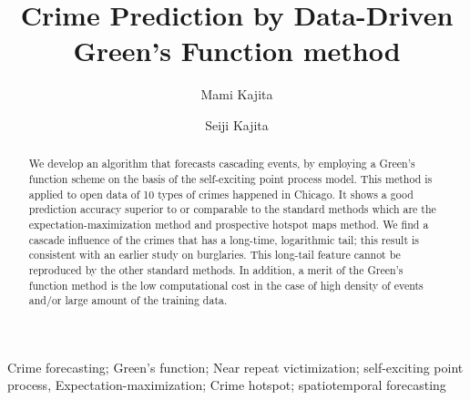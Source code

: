 \documentclass[review]{elsarticle}
\begin{document}
\begin{frontmatter}
\title{
Crime Prediction by Data-Driven Green's Function method
}
\author[mymainaddress,mysecondaryaddress]{Mami Kajita}
\author[mymainaddress]{Seiji Kajita}

\address[mymainaddress]{Singular Perturbations Inc, 1-5-6-5F, Kudanminami, Chiyoda-ku, Tokyo, 102-0074, Japan}
\address[mysecondaryaddress]{Center for Spatial Information Science (CSIS), the University of Tokyo, 5-1-5 Kashiwanoha, Kashiwa-shi, Chiba, 277-8568, Japan }

\begin{abstract}
We develop an algorithm that forecasts cascading events, by employing a Green's function scheme on the basis of the self-exciting point process  model.
This method is applied to open data of 10 types of crimes happened in Chicago. It shows a good prediction accuracy superior to or comparable to the standard methods which are the expectation-maximization method and prospective hotspot maps method.
We find a cascade influence of the crimes that has a long-time, logarithmic tail; this result is consistent with an earlier study on burglaries.
This  long-tail feature cannot be reproduced by the other standard methods.
In addition, a merit of the Green's function method
is the low computational cost  in the case of
high density of events and/or large amount of the training data.
\end{abstract}


\begin{keyword}
Crime forecasting; 
Green's function; 
Near repeat victimization;
self-exciting point process,
Expectation-maximization; 
Crime hotspot;
spatiotemporal forecasting
\end{keyword}

\end{frontmatter}






\end{document}
